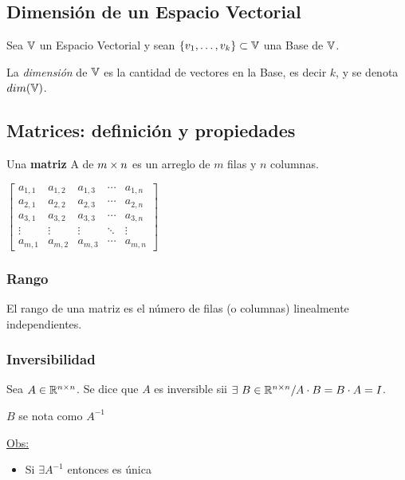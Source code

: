 \subsection{Dimensión de un Espacio Vectorial}
Sea $\mathbb{V}$ un Espacio Vectorial y sean $\{v_1, \dots, v_k\} \subset \mathbb{V}$ una Base de $\mathbb{V}$.
\begin{defi}
	La \textit{dimensión} de $\mathbb{V}$ es la cantidad de vectores en la Base, es decir $k$,
	y se denota $dim(\mathbb{V})$.
\end{defi}

\subsection{Matrices: definición y propiedades}
\begin{defi}
	Una \textbf{matriz} A de $m \times n$ es un arreglo de $m$ filas y $n$ columnas. \\
	\begin{center}
		$\begin{bmatrix}
			a_{1,1} & a_{1,2} & a_{1,3} & \cdots & a_{1,n} \\
			a_{2,1} & a_{2,2} & a_{2,3} & \cdots & a_{2,n} \\
			a_{3,1} & a_{3,2} & a_{3,3} & \cdots & a_{3,n} \\
			\vdots & \vdots & \vdots & \ddots & \vdots \\
			a_{m,1} & a_{m,2} & a_{m,3} & \cdots & a_{m,n}
		\end{bmatrix}$
	\end{center}
\end{defi}

\subsubsection{Rango}
El rango de una matriz es el número de filas (o columnas) linealmente independientes.

\subsubsection{Inversibilidad}
Sea $A \in\mathbb{R}^{n\times n}$. Se dice que $A$ es inversible sii $\exists\ B\in\mathbb{R}^{n\times n} / A\cdot B = B\cdot A = I$.

$B$ se nota como $A^{-1}$

\underline{Obs:}
\begin{itemize}
	\item Si $\exists A^{-1}$ entonces es única
\end{itemize}

